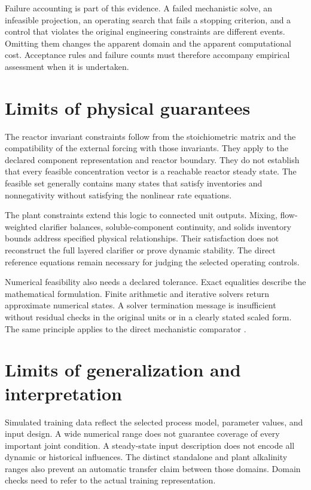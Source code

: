 Failure accounting is part of this evidence. A failed mechanistic solve, an infeasible projection, an operating search that fails a stopping criterion, and a control that violates the original engineering constraints are different events. Omitting them changes the apparent domain and the apparent computational cost. Acceptance rules and failure counts must therefore accompany empirical assessment when it is undertaken.

\section{Limits of physical guarantees}

The reactor invariant constraints follow from the stoichiometric matrix and the compatibility of the external forcing with those invariants. They apply to the declared component representation and reactor boundary. They do not establish that every feasible concentration vector is a reachable reactor steady state. The feasible set generally contains many states that satisfy inventories and nonnegativity without satisfying the nonlinear rate equations.

The plant constraints extend this logic to connected unit outputs. Mixing, flow-weighted clarifier balances, soluble-component continuity, and solids inventory bounds address specified physical relationships. Their satisfaction does not reconstruct the full layered clarifier or prove dynamic stability. The direct reference equations remain necessary for judging the selected operating controls.

Numerical feasibility also needs a declared tolerance. Exact equalities describe the mathematical formulation. Finite arithmetic and iterative solvers return approximate numerical states. A solver termination message is insufficient without residual checks in the original units or in a clearly stated scaled form. The same principle applies to the direct mechanistic comparator \citep{Boyd2004,BuzziFerraris2013}.

\section{Limits of generalization and interpretation}

Simulated training data reflect the selected process model, parameter values, and input design. A wide numerical range does not guarantee coverage of every important joint condition. A steady-state input description does not encode all dynamic or historical influences. The distinct standalone and plant alkalinity ranges also prevent an automatic transfer claim between those domains. Domain checks need to refer to the actual training representation.

